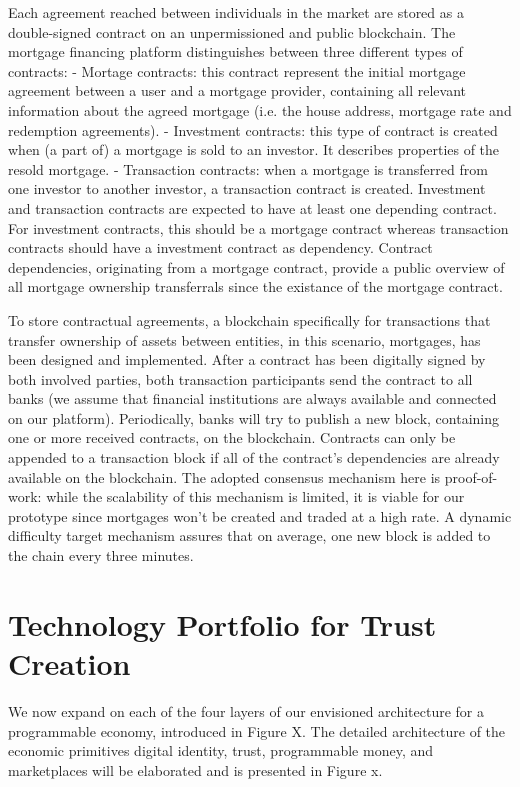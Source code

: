 \documentclass[USenglish]{article}
\begin{document}
Each agreement reached between individuals in the market are stored as a double-signed contract on an unpermissioned and public blockchain. The mortgage financing platform distinguishes between three different types of contracts:
- Mortage contracts: this contract represent the initial mortgage agreement between a user and a mortgage provider, containing all relevant information about the agreed mortgage (i.e. the house address, mortgage rate and redemption agreements).
- Investment contracts: this type of contract is created when (a part of) a mortgage is sold to an investor. It describes properties of the resold mortgage.
- Transaction contracts: when a mortgage is transferred from one investor to another investor, a transaction contract is created.
Investment and transaction contracts are expected to have at least one depending contract.
For investment contracts, this should be a mortgage contract whereas transaction contracts should have a investment contract as dependency.
Contract dependencies, originating from a mortgage contract, provide a public overview of all mortgage ownership transferrals since the existance of the mortgage contract.

To store contractual agreements, a blockchain specifically for transactions that transfer ownership of assets between entities, in this scenario, mortgages, has been designed and implemented.
After a contract has been digitally signed by both involved parties, both transaction participants send the contract to all banks (we assume that financial institutions are always available and connected on our platform).
Periodically, banks will try to publish a new block, containing one or more received contracts, on the blockchain.
Contracts can only be appended to a transaction block if all of the contract's dependencies are already available on the blockchain.
The adopted consensus mechanism here is proof-of-work: while the scalability of this mechanism is limited, it is viable for our prototype since mortgages won't be created and traded at a high rate.
A dynamic difficulty target mechanism assures that on average, one new block is added to the chain every three minutes.

\section{Technology Portfolio for Trust Creation}

We now expand on each of the four layers of our envisioned architecture for a programmable economy, introduced in Figure X.
The detailed architecture of the economic primitives digital identity, trust, programmable money, and marketplaces will be elaborated and is presented in Figure x.
\end{document}
